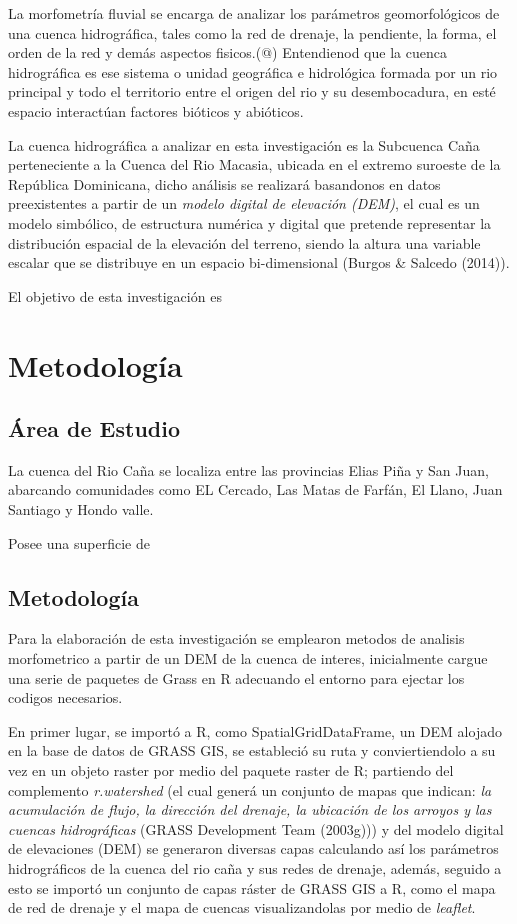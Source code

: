\documentclass[11pt,]{article}
\begin{document}
La morfometría fluvial se encarga de analizar los parámetros
geomorfológicos de una cuenca hidrográfica, tales como la red de
drenaje, la pendiente, la forma, el orden de la red y demás aspectos
fisicos.(@) Entendienod que la cuenca hidrográfica es ese sistema o
unidad geográfica e hidrológica formada por un rio principal y todo el
territorio entre el origen del rio y su desembocadura, en esté espacio
interactúan factores bióticos y abióticos.

La cuenca hidrográfica a analizar en esta investigación es la Subcuenca
Caña perteneciente a la Cuenca del Rio Macasia, ubicada en el extremo
suroeste de la República Dominicana, dicho análisis se realizará
basandonos en datos preexistentes a partir de un \emph{modelo digital de
elevación (DEM)}, el cual es un modelo simbólico, de estructura numérica
y digital que pretende representar la distribución espacial de la
elevación del terreno, siendo la altura una variable escalar que se
distribuye en un espacio bi-dimensional (Burgos \& Salcedo (2014)).

El objetivo de esta investigación es

\section{Metodología}\label{metodologuxeda}

\subsection{Área de Estudio}\label{uxe1rea-de-estudio}

La cuenca del Rio Caña se localiza entre las provincias Elias Piña y San
Juan, abarcando comunidades como EL Cercado, Las Matas de Farfán, El
Llano, Juan Santiago y Hondo valle.

Posee una superficie de

\subsection{Metodología}\label{metodologuxeda-1}

Para la elaboración de esta investigación se emplearon metodos de
analisis morfometrico a partir de un DEM de la cuenca de interes,
inicialmente cargue una serie de paquetes de Grass en R adecuando el
entorno para ejectar los codigos necesarios.

En primer lugar, se importó a R, como SpatialGridDataFrame, un DEM
alojado en la base de datos de GRASS GIS, se estableció su ruta y
conviertiendolo a su vez en un objeto raster por medio del paquete
raster de R; partiendo del complemento \emph{r.watershed} (el cual
generá un conjunto de mapas que indican: \emph{la acumulación de flujo,
la dirección del drenaje, la ubicación de los arroyos y las cuencas
hidrográficas} (GRASS Development Team (2003g))) y del modelo digital de
elevaciones (DEM) se generaron diversas capas calculando así los
parámetros hidrográficos de la cuenca del rio caña y sus redes de
drenaje, además, seguido a esto se importó un conjunto de capas ráster
de GRASS GIS a R, como el mapa de red de drenaje y el mapa de cuencas
visualizandolas por medio de \emph{leaflet}.
\end{document}
